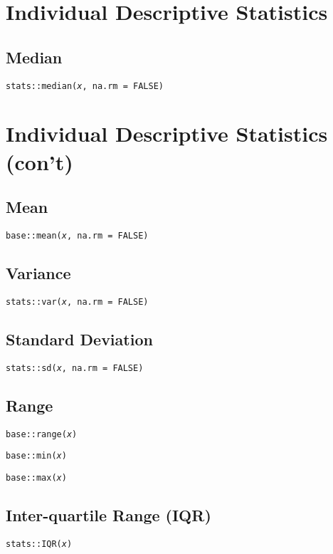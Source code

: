 \documentclass{tufte-handout}
\newenvironment{subs}
  {\adjustwidth{3em}{0pt}}
  {\endadjustwidth}
\begin{document}
\vspace{5mm}
\section{Individual Descriptive Statistics}
\begin{subs}
\vspace{3mm}
\subsection{Median}
\texttt{stats::}{\color{red}\texttt{median}}\texttt{(\textit{x}, na.rm = FALSE)}
\end{subs}

\newpage
\section{Individual Descriptive Statistics (con't)}
\begin{subs}
\subsection{Mean}
\texttt{base::}{\color{red}\texttt{mean}}\texttt{(\textit{x}, na.rm = FALSE)}

\vspace{3mm}
\subsection{Variance}
\texttt{stats::}{\color{red}\texttt{var}}\texttt{(\textit{x}, na.rm = FALSE)}

\vspace{3mm}
\subsection{Standard Deviation}
\texttt{stats::}{\color{red}\texttt{sd}}\texttt{(\textit{x}, na.rm = FALSE)}

\vspace{3mm}
\subsection{Range}
\texttt{base::}{\color{red}\texttt{range}}\texttt{(\textit{x})}
\par \noindent \texttt{base::}{\color{red}\texttt{min}}\texttt{(\textit{x})}
\par \noindent \texttt{base::}{\color{red}\texttt{max}}\texttt{(\textit{x})}

\vspace{3mm}
\subsection{Inter-quartile Range (IQR)}
\texttt{stats::}{\color{red}\texttt{IQR}}\texttt{(\textit{x})}
\end{subs}
\end{document}
